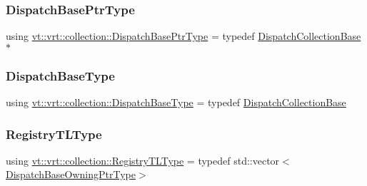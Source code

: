\mbox{\label{namespacevt_1_1vrt_1_1collection_aa3b9731ae16d60fac43d68840f3606a5}} 
\subsubsection{\texorpdfstring{Dispatch\+Base\+Ptr\+Type}{DispatchBasePtrType}}
{\footnotesize\ttfamily using \hyperlink{namespacevt_1_1vrt_1_1collection_aa3b9731ae16d60fac43d68840f3606a5}{vt\+::vrt\+::collection\+::\+Dispatch\+Base\+Ptr\+Type} = typedef \hyperlink{structvt_1_1vrt_1_1collection_1_1_dispatch_collection_base}{Dispatch\+Collection\+Base}$\ast$}

\mbox{\label{namespacevt_1_1vrt_1_1collection_a9e2462f78f56998464ffc7f35369c70f}} 
\subsubsection{\texorpdfstring{Dispatch\+Base\+Type}{DispatchBaseType}}
{\footnotesize\ttfamily using \hyperlink{namespacevt_1_1vrt_1_1collection_a9e2462f78f56998464ffc7f35369c70f}{vt\+::vrt\+::collection\+::\+Dispatch\+Base\+Type} = typedef \hyperlink{structvt_1_1vrt_1_1collection_1_1_dispatch_collection_base}{Dispatch\+Collection\+Base}}

\mbox{\label{namespacevt_1_1vrt_1_1collection_aecdad7ed4df3be1bab2a6bb9c5945964}} 
\subsubsection{\texorpdfstring{Registry\+T\+L\+Type}{RegistryTLType}}
{\footnotesize\ttfamily using \hyperlink{namespacevt_1_1vrt_1_1collection_aecdad7ed4df3be1bab2a6bb9c5945964}{vt\+::vrt\+::collection\+::\+Registry\+T\+L\+Type} = typedef std\+::vector$<$\hyperlink{namespacevt_1_1vrt_1_1collection_a124f83d203352b6bccc4f12ca489b68b}{Dispatch\+Base\+Owning\+Ptr\+Type}$>$}

